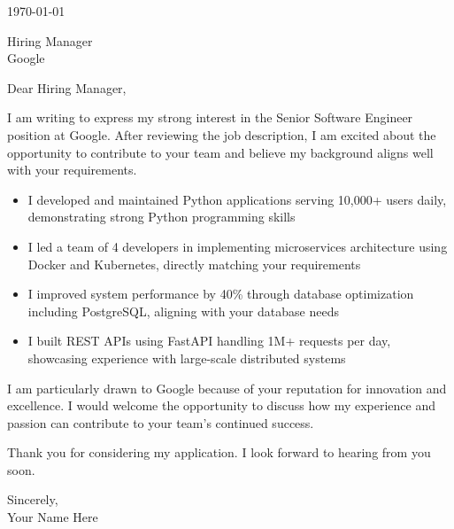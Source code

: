 \documentclass[11pt,letterpaper]{article}
\begin{document}
\noindent
\today

\vspace{1em}

\noindent
Hiring Manager \\
Google \\

\vspace{1em}

\noindent
Dear Hiring Manager,

I am writing to express my strong interest in the Senior Software Engineer position at Google. After reviewing the job description, I am excited about the opportunity to contribute to your team and believe my background aligns well with your requirements.

\begin{itemize}[leftmargin=*]
\item I developed and maintained Python applications serving 10,000+ users daily, demonstrating strong Python programming skills
\item I led a team of 4 developers in implementing microservices architecture using Docker and Kubernetes, directly matching your requirements
\item I improved system performance by 40\% through database optimization including PostgreSQL, aligning with your database needs
\item I built REST APIs using FastAPI handling 1M+ requests per day, showcasing experience with large-scale distributed systems
\end{itemize}

I am particularly drawn to Google because of your reputation for innovation and excellence. I would welcome the opportunity to discuss how my experience and passion can contribute to your team's continued success.

Thank you for considering my application. I look forward to hearing from you soon.

\vspace{1em}

\noindent
Sincerely, \\
Your Name Here
\end{document}
